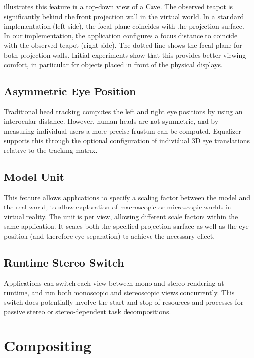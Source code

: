  illustrates this feature in a top-down view of a Cave. The
observed teapot is significantly behind the front projection wall in the
virtual world. In a standard implementation (left side), the focal plane
coincides with the projection surface. In our implementation, the application
configures a focus distance to coincide with the observed teapot (right side).
The dotted line shows the focal plane for both projection walls. Initial
experiments show that this provides better viewing comfort, in particular for
objects placed in front of the physical displays.

\subsection{Asymmetric Eye Position}

Traditional head tracking computes the left and right eye positions by using an
interocular distance. However, human heads are not symmetric, and by measuring
individual users a more precise frustum can be computed. \textsf{Equalizer}
supports this through the optional configuration of individual 3D eye
translations relative to the tracking matrix.

\subsection{Model Unit}

This feature allows applications to specify a scaling factor between the model
and the real world, to allow exploration of macroscopic or microscopic worlds
in virtual reality. The unit is per view, allowing different scale factors
within the same application. It scales both the specified projection surface as
well as the eye position (and therefore eye separation) to achieve the
necessary effect.

\subsection{Runtime Stereo Switch}

Applications can switch each view between mono and stereo rendering at runtime,
and run both monoscopic and stereoscopic views concurrently. This switch does
potentially involve the start and stop of resources and processes for passive
stereo or stereo-dependent task decompositions.

\section{Compositing}


